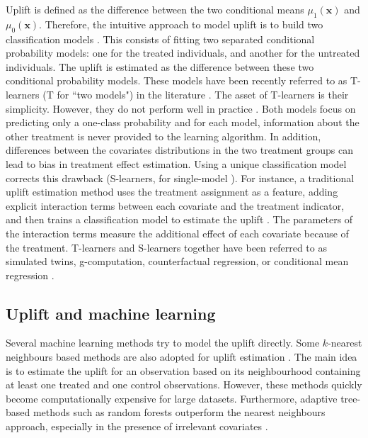 \documentclass{article}
\def\x{\mathbf x}
\begin{document}
Uplift is defined as the difference between the two conditional means $\mu_1(\x)$ and $\mu_0(\x)$. Therefore, the intuitive approach to model uplift is to build two classification models \citep{hansotia2002direct,snowden2011implementation,austin2012using}. This consists of fitting two separated conditional probability models: one for the treated individuals, and another for the untreated individuals. The uplift is estimated as the difference between these two conditional probability models. These models have been recently referred to as T-learners (T for ``two models") in the literature \citep{kunzel2019metalearners}. The asset of T-learners is their simplicity. However, they do not perform well in practice \citep{radcliffe2011real}. Both models focus on predicting only a one-class probability and for each model, information about the other treatment is never provided to the learning algorithm. In addition, differences between the covariates distributions in the two treatment groups can lead to bias in treatment effect estimation. Using a unique classification model corrects this drawback (S-learners, for single-model \citep{kunzel2019metalearners}). For instance, a traditional uplift estimation method uses the treatment assignment as a feature, adding explicit interaction terms between each covariate and the treatment indicator, and then trains a classification model to estimate the uplift \citep{lo2002true}. The parameters of the interaction terms measure the additional effect of each covariate because of the treatment. T-learners and S-learners together have been referred to as simulated twins, g-computation, counterfactual regression, or conditional mean regression \citep{schuler2018comparison}.

\subsection{Uplift and machine learning}

Several machine learning methods try to model the uplift directly. Some $k$-nearest neighbours \citep{cover1967nearest} based methods are also adopted for uplift estimation \citep{crump2008nonparametric, Alemi.etal-PersonalizedMedicine-2009, su2012facilitating}. The main idea is to estimate the uplift for an observation based on its neighbourhood containing at least one treated and one control observations. However, these methods quickly become computationally expensive for large datasets. Furthermore, adaptive tree-based methods such as random forests outperform the nearest neighbours approach, especially in the presence of irrelevant covariates \citep{wager2018estimation}. 
\end{document}
